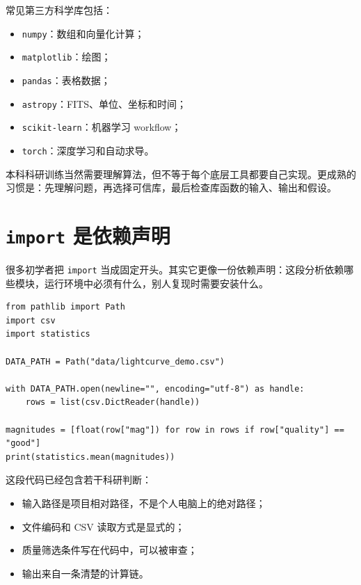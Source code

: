 常见第三方科学库包括：

\begin{itemize}
    \item \texttt{numpy}：数组和向量化计算；
    \item \texttt{matplotlib}：绘图；
    \item \texttt{pandas}：表格数据；
    \item \texttt{astropy}：FITS、单位、坐标和时间；
    \item \texttt{scikit-learn}：机器学习 workflow；
    \item \texttt{torch}：深度学习和自动求导。
\end{itemize}

\begin{protip}
本科科研训练当然需要理解算法，但不等于每个底层工具都要自己实现。更成熟的习惯是：先理解问题，再选择可信库，最后检查库函数的输入、输出和假设。
\end{protip}

\section{\texttt{import} 是依赖声明}

很多初学者把 \texttt{import} 当成固定开头。其实它更像一份依赖声明：这段分析依赖哪些模块，运行环境中必须有什么，别人复现时需要安装什么。

\begin{examplebox}[一个很小但完整的依赖片段]
\begin{lstlisting}[style=pythonstyle]
from pathlib import Path
import csv
import statistics

DATA_PATH = Path("data/lightcurve_demo.csv")

with DATA_PATH.open(newline="", encoding="utf-8") as handle:
    rows = list(csv.DictReader(handle))

magnitudes = [float(row["mag"]) for row in rows if row["quality"] == "good"]
print(statistics.mean(magnitudes))
\end{lstlisting}
\end{examplebox}

这段代码已经包含若干科研判断：

\begin{itemize}
    \item 输入路径是项目相对路径，不是个人电脑上的绝对路径；
    \item 文件编码和 CSV 读取方式是显式的；
    \item 质量筛选条件写在代码中，可以被审查；
    \item 输出来自一条清楚的计算链。
\end{itemize}

